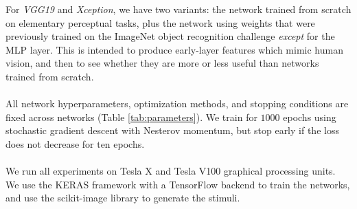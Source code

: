 For \emph{VGG19} and \emph{Xception}, we have two variants: the network trained from scratch on elementary perceptual tasks, plus the network using weights that were previously trained on the ImageNet object recognition challenge \emph{except} for the MLP layer. This is intended to produce early-layer features which mimic human vision, and then to see whether they are more or less useful than networks trained from scratch. 
\\~\\
 All network hyperparameters, optimization methods, and stopping conditions are fixed across networks (Table \ref{tab:parameters}). We train for $1000$ epochs using stochastic gradient descent with Nesterov momentum, but stop early if the loss does not decrease for ten epochs.
\\~\\
 We run all experiments on Tesla X and Tesla V100 graphical processing units. We use the KERAS framework with a TensorFlow backend to train the networks, and use the scikit-image library to generate the stimuli. %

